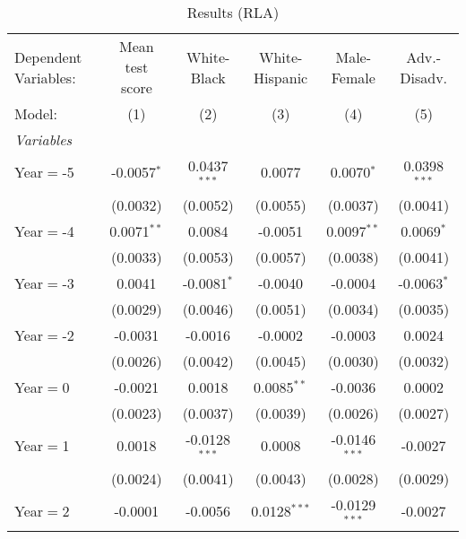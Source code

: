 
\begin{table}[htbp]
   \centering
   \caption{\label{MainResultsRLA} Results (RLA)}
   \begin{tabular}{lccccc}
      \tabularnewline\midrule\midrule
      Dependent Variables: & Mean test score        & White-Black     & White-Hispanic & Male-Female     & Adv.-Disadv.\\
      Model:               & (1)                    & (2)             & (3)            & (4)             & (5)\\
      \midrule \emph{Variables} &   &   &   &   &  \\
      Year$=$-5            & -0.0057$^{*}$          & 0.0437$^{***}$  & 0.0077         & 0.0070$^{*}$    & 0.0398$^{***}$\\
                           & (0.0032)               & (0.0052)        & (0.0055)       & (0.0037)        & (0.0041)\\
      Year$=$-4            & 0.0071$^{**}$          & 0.0084          & -0.0051        & 0.0097$^{**}$   & 0.0069$^{*}$\\
                           & (0.0033)               & (0.0053)        & (0.0057)       & (0.0038)        & (0.0041)\\
      Year$=$-3            & 0.0041                 & -0.0081$^{*}$   & -0.0040        & -0.0004         & -0.0063$^{*}$\\
                           & (0.0029)               & (0.0046)        & (0.0051)       & (0.0034)        & (0.0035)\\
      Year$=$-2            & -0.0031                & -0.0016         & -0.0002        & -0.0003         & 0.0024\\
                           & (0.0026)               & (0.0042)        & (0.0045)       & (0.0030)        & (0.0032)\\
      Year$=$0             & -0.0021                & 0.0018          & 0.0085$^{**}$  & -0.0036         & 0.0002\\
                           & (0.0023)               & (0.0037)        & (0.0039)       & (0.0026)        & (0.0027)\\
      Year$=$1             & 0.0018                 & -0.0128$^{***}$ & 0.0008         & -0.0146$^{***}$ & -0.0027\\
                           & (0.0024)               & (0.0041)        & (0.0043)       & (0.0028)        & (0.0029)\\
      Year$=$2             & -0.0001                & -0.0056         & 0.0128$^{***}$ & -0.0129$^{***}$ & -0.0027\\

\end{tabular}
\end{table}
